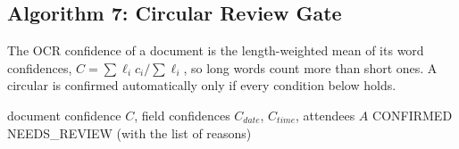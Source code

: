 \subsection{Algorithm 7: Circular Review Gate}
The OCR confidence of a document is the length-weighted mean of its word confidences, $C = \sum \ell_i c_i / \sum \ell_i$, so long words count more than short ones. A circular is confirmed automatically only if every condition below holds.
\begin{algorithm}[H]
\caption{Circular review gate (infrastructure/ocr/extractor.py)}
\begin{algorithmic}[1]
\Require document confidence $C$, field confidences $C_{date}$, $C_{time}$, attendees $A$
   \Return CONFIRMED \EndIf
\EndIf
\State \Return NEEDS\_REVIEW (with the list of reasons)
\end{algorithmic}
\end{algorithm}
